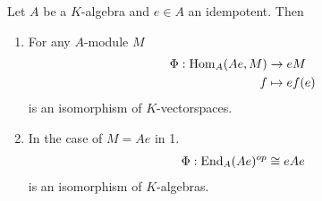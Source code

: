 \documentclass[]{article}
\begin{document}
\begin{example}
    Let \(A\) be a \(K\)-algebra and \(e \in A\) an idempotent. Then  
   \begin{enumerate}
    \item For any \(A\)-module \(M\) 
        \begin{align*}
            \Phi:\operatorname{Hom}_A(Ae,M) &\rightarrow eM \\
                            f &\mapsto ef(e)
        \end{align*}
    is an isomorphism of \(K\)-vectorspaces.
    \item In the case of \(M=Ae\) in 1.
        \begin{align*}
        \Phi:\operatorname{End}_A(Ae)^{op} \cong eAe
        \end{align*}
    is an isomorphism of \(K\)-algebras.
   \end{enumerate} 
\end{example}
\end{document}
